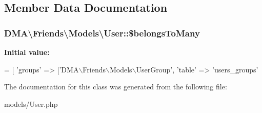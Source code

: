\subsection{Member Data Documentation}
\hypertarget{classDMA_1_1Friends_1_1Models_1_1User_af33f5b53bdb9a5e3156fd5c8ab53785b}{
\subsubsection[{\$belongs\-To\-Many}]{\setlength{\rightskip}{0pt plus 5cm}D\-M\-A\textbackslash{}\-Friends\textbackslash{}\-Models\textbackslash{}\-User\-::\$belongs\-To\-Many}}\label{classDMA_1_1Friends_1_1Models_1_1User_af33f5b53bdb9a5e3156fd5c8ab53785b}
{\bfseries Initial value\-:}
\begin{DoxyCode}
= [
        \textcolor{stringliteral}{'groups'} => [\textcolor{stringliteral}{'DMA\(\backslash\)Friends\(\backslash\)Models\(\backslash\)UserGroup'}, \textcolor{stringliteral}{'table'} => \textcolor{stringliteral}{'users\_groups'}
\end{DoxyCode}


The documentation for this class was generated from the following file\-:\begin{DoxyCompactItemize}
\item 
models/User.\-php\end{DoxyCompactItemize}
